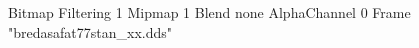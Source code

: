 {Bitmap
	{Filtering 1}
	{Mipmap 1}
	{Blend none}
	{AlphaChannel 0}
	{Frame "bredasafat77stan_xx.dds"}
}
